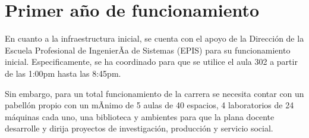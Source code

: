 \section{Primer año de funcionamiento}

En cuanto a la infraestructura inicial, se cuenta con el apoyo de la Dirección de la Escuela Profesional de IngenierÃ­a de Sistemas (EPIS) para su funcionamiento inicial. Especificamente, se ha coordinado para que se utilice el aula 302 a partir de las 1:00pm hasta las 8:45pm.

Sin embargo, para un total funcionamiento de la carrera se necesita contar con un pabellón propio con un mÃ­nimo de 5 aulas de 40 espacios, 4 laboratorios de 24 máquinas cada uno, una biblioteca y ambientes para que la plana docente desarrolle y dirija proyectos de investigación, producción y servicio social.

